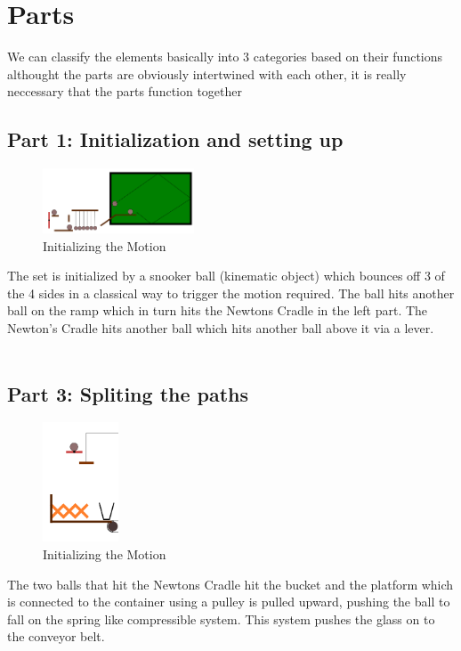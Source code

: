 \documentclass[a4paper,10pt]{article}
\begin{document}
\section*{Parts}
We can classify the elements basically into 3 categories based on their functions althought the parts are obviously intertwined with each other, it is really neccessary that the parts function together
\subsection*{Part 1: Initialization and setting up}
\begin{figure}

\begin{center}
\vspace{-10pt}
\includegraphics[width=0.4\textwidth]{img_p2}

\caption{Initializing the Motion}
\end{center}
\end{figure}
\hfill \break The set is initialized by a snooker ball (kinematic object) which bounces off 3 of the 4 sides in a classical way to trigger the motion required. The ball hits another ball on the ramp which in turn hits the Newtons Cradle in the left part. The Newton's Cradle hits another ball which hits another ball above it via a lever.\\ \\ 
\clearpage
\subsection*{Part 3: Spliting the paths}
\begin{figure}

\begin{center}
\vspace{-30pt}
\includegraphics[width=0.2\textwidth]{img_p1}

\caption{Initializing the Motion}
\end{center}
\end{figure}
\hfill \break The two balls that hit the Newtons Cradle hit the bucket and the platform which is connected to the container using a pulley is pulled upward, pushing the ball to fall on the spring like compressible system. This system pushes the glass on to the conveyor belt.\\ \\
\medskip
\medskip
\hfill \break
\hfill \break\hfill \break
\hfill \break
\hfill \break
\end{document}

